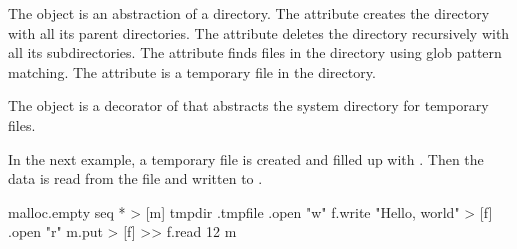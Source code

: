 The object  is an abstraction of a directory.
%
The attribute  creates the directory with all its parent directories.
%
The attribute  deletes the directory recursively with all its subdirectories.
%
The attribute  finds files in the directory using glob pattern matching.
%
The attribute  is a temporary file in the directory.

The object  is a decorator of  that abstracts the system
  directory for temporary files.

In the next example, a temporary file is created and filled up with .
Then the data is read from the file and written to .

\begin{ffcode}
malloc.empty
  seq * > [m]
    tmpdir
    .tmpfile
    .open
      "w"
      f.write "Hello, world" > [f]
    .open
      "r"
      m.put > [f] >>
        f.read 12
    m
\end{ffcode}
